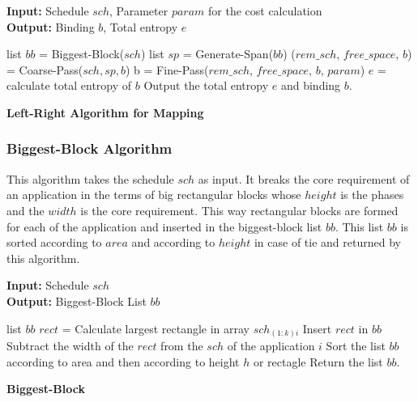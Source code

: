 \documentclass[10pt, conference]{IEEEtran}
\begin{document}
\begin{algorithm}[tb]
\footnotesize
\textbf{Input:} Schedule $sch$, Parameter $param$ for the cost calculation \ \\
\textbf{Output:} Binding $b$, Total entropy $e$
\begin{algorithmic}[1]
\STATE list $bb$ = Biggest-Block($sch$)
\STATE list $sp$ = Generate-Span($bb$)
\STATE  ($rem\_sch$, $free\_space$, $b$) = Coarse-Pass($sch, sp, b$)
\STATE b = Fine-Pass($rem\_sch$, $free\_space$, $b$, $param$)
\STATE  $e$ = calculate total entropy of $b$
\STATE Output the total entropy $e$ and binding $b$.
\end{algorithmic}
\caption{\textbf{Left-Right Algorithm for Mapping}}
\vspace{-0.1cm}
\label{algLR}
\end{algorithm}

\subsubsection{Biggest-Block Algorithm}
This algorithm takes the schedule $sch$ as input. It breaks the core requirement of an application in the terms of big rectangular blocks whose $height$ is the phases and the $width$ is the core requirement. This way rectangular blocks are formed for each of the application and inserted in the biggest-block list $bb$. This list $bb$ is sorted according to $area$ and according to $height$ in case of tie and returned by this algorithm. 

\begin{algorithm}[tb]
\footnotesize
\textbf{Input:} Schedule $sch$ \ \\
\textbf{Output:} Biggest-Block List $bb$
\begin{algorithmic}[1]
\STATE list $bb$
		\STATE $rect$ = Calculate largest rectangle in array $sch_{(1:k)i}$
		\STATE Insert $rect$ in $bb$
			\STATE Subtract the width of the $rect$ from the $sch$ of the application $i$ 
		\ENDFOR	
	\ENDWHILE
\ENDFOR
\STATE Sort the list $bb$ according to area and then according to height $h$ or rectagle
\STATE Return the list $bb$.
\end{algorithmic}
\caption{\textbf{Biggest-Block}}
\vspace{-0.1cm}
\label{algBB}
\end{algorithm}

\end{document}
